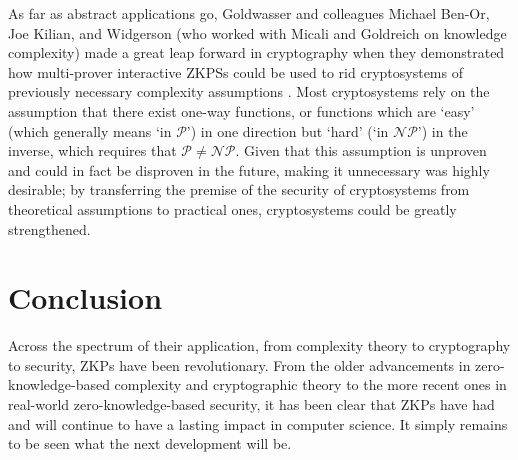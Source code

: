 \documentclass{article}
\begin{document}
As far as abstract applications go, Goldwasser and colleagues Michael Ben-Or, Joe Kilian, and Widgerson (who worked with Micali and Goldreich on knowledge complexity) made a great leap forward in cryptography when they demonstrated how multi-prover interactive ZKPSs could be used to rid cryptosystems of previously necessary complexity assumptions \cite{BGKW}. Most cryptosystems rely on the assumption that there exist one-way functions, or functions which are `easy' (which generally means `in $\mathcal{P}$') in one direction but `hard' (`in $\mathcal{NP}$') in the inverse, which requires that $\mathcal{P} \neq \mathcal{NP}$. Given that this assumption is unproven and could in fact be disproven in the future, making it unnecessary was highly desirable; by transferring the premise of the security of cryptosystems from theoretical assumptions to practical ones, cryptosystems could be greatly strengthened.


\section{Conclusion}

Across the spectrum of their application, from complexity theory to cryptography to security, ZKPs have been revolutionary. From the older advancements in zero-knowledge-based complexity and cryptographic theory to the more recent ones in real-world zero-knowledge-based security, it has been clear that ZKPs have had and will continue to have a lasting impact in computer science. It simply remains to be seen what the next development will be.

\printbibliography
\end{document}

